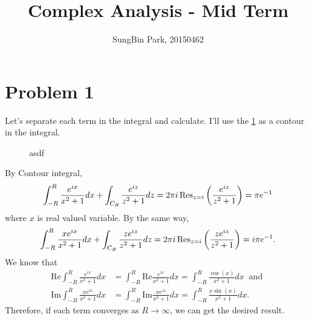\documentclass{article}
\begin{document}
\title{Complex Analysis - Mid Term}
\author{SungBin Park, 20150462} 

\maketitle

\section*{Problem 1}
Let's separate each term in the integral and calculate. I'll use the \ref{Fig:P1} as a contour in the integral. 
\begin{figure}[h]
\centering
{}
\caption{asdf}
\label{Fig:P1}
\end{figure}
By Contour integral,
\begin{equation*}
\int_{-R}^R\frac{e^{ix}}{x^2+1}dx+\int_{C_R} \frac{e^{iz}}{z^2+1}dz=2\pi i \Res_{z=i} \left(\frac{e^{iz}}{z^2+1}\right)=\pi e^{-1}
\end{equation*}
where $x$ is real valued variable. By the same way,
\begin{equation*}
\int_{-R}^R \frac{xe^{ix}}{x^2+1}dx+\int_{C_R} \frac{ze^{iz}}{z^2+1}dz=2\pi i \Res_{z=i} \left(\frac{ze^{iz}}{z^2+1}\right)=i\pi e^{-1}.
\end{equation*}
We know that
\begin{equation*}
\begin{split}
\text{Re}\int_{-R}^R\frac{e^{ix}}{x^2+1}dx&=\int_{-R}^R\text{Re}\frac{e^{ix}}{x^2+1}dx=\int_{-R}^R\frac{\cos(x)}{x^2+1}dx ~\text{ and } \\
\text{Im}\int_{-R}^R\frac{xe^{ix}}{x^2+1}dx&=\int_{-R}^R\text{Im}\frac{xe^{ix}}{x^2+1}dx=\int_{-R}^R\frac{x\sin(x)}{x^2+1}dx.
\end{split}
\end{equation*}
Therefore, if each term converges as $R\rightarrow \infty$, we can get the desired result.
\end{document}
